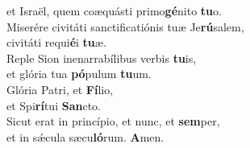 \evenverse et Israël, quem coæquásti primo\textbf{gé}nito \textbf{tu}o.\\
\oddverse Miserére civitáti sanctificatiónis tuæ Je\textbf{rú}salem,~\*\\
\oddverse civitáti requi\textbf{é}i \textbf{tu}æ.\\
\evenverse Reple Sion inenarrabílibus verbis \textbf{tu}is,~\*\\
\evenverse et glória tua \textbf{pó}pulum \textbf{tu}um.\\
\oddverse Glória Patri, et \textbf{Fí}lio,~\*\\
\oddverse et Spi\textbf{rí}tui \textbf{San}cto.\\
\evenverse Sicut erat in princípio, et nunc, et \textbf{sem}per,~\*\\
\evenverse et in sǽcula sæcu\textbf{ló}rum. \textbf{A}men.\\
